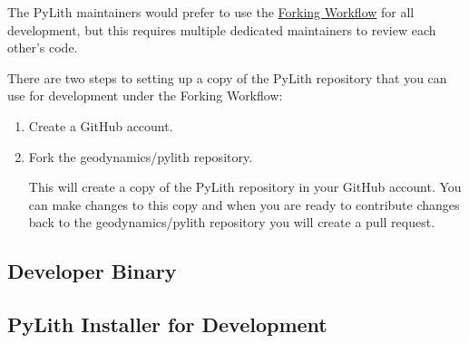 The PyLith maintainers would prefer to use the
\href{https://www.atlassian.com/git/tutorials/comparing-workflows/forking-workflow}{Forking
  Workflow} for all development, but this requires multiple dedicated
maintainers to review each other's code.

There are two steps to setting up a copy of the PyLith repository that
you can use for development under the Forking Workflow:
\begin{enumerate}
\item Create a GitHub account.
\item Fork the geodynamics/pylith repository.

  This will create a copy of the PyLith repository in your GitHub
  account. You can make changes to this copy and when you are ready to
  contribute changes back to the geodynamics/pylith
  repository you will create a pull request.

\end{enumerate}


\subsection{Developer Binary}


\subsection{PyLith Installer for Development}

